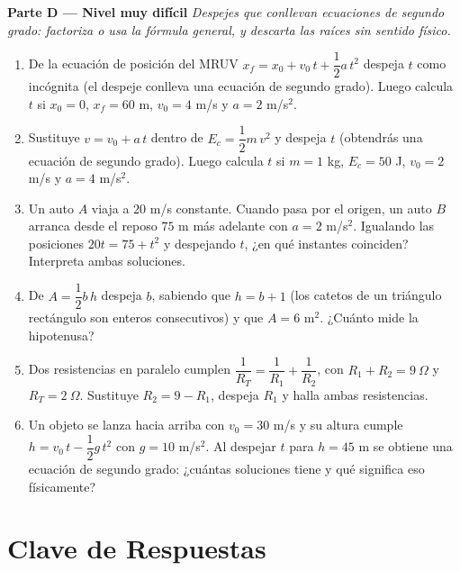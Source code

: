 \documentclass[12pt, letterpaper]{article}
\begin{document}
\medskip
\noindent\textbf{Parte D --- Nivel muy difícil \muyDificil}\quad \emph{Despejes que conllevan ecuaciones de segundo grado: factoriza o usa la fórmula general, y descarta las raíces sin sentido físico.}

\begin{enumerate}[leftmargin=*, resume]
  \item \muyDificil{} De la ecuación de posición del MRUV $x_f = x_0 + v_0\,t + \dfrac{1}{2}a\,t^2$ despeja $t$ como incógnita (el despeje conlleva una ecuación de segundo grado). Luego calcula $t$ si $x_0 = 0$, $x_f = 60$ m, $v_0 = 4$ m/s y $a = 2$ m/s$^2$.

  \item \muyDificil{} Sustituye $v = v_0 + a\,t$ dentro de $E_c = \dfrac{1}{2}m\,v^2$ y despeja $t$ (obtendrás una ecuación de segundo grado). Luego calcula $t$ si $m = 1$ kg, $E_c = 50$ J, $v_0 = 2$ m/s y $a = 4$ m/s$^2$.

  \item \muyDificil{} Un auto $A$ viaja a $20$ m/s constante. Cuando pasa por el origen, un auto $B$ arranca desde el reposo $75$ m más adelante con $a = 2$ m/s$^2$. Igualando las posiciones $20t = 75 + t^2$ y despejando $t$, ¿en qué instantes coinciden? Interpreta ambas soluciones.

  \item \muyDificil{} De $A = \dfrac{1}{2}b\,h$ despeja $b$, sabiendo que $h = b + 1$ (los catetos de un triángulo rectángulo son enteros consecutivos) y que $A = 6$ m$^2$. ¿Cuánto mide la hipotenusa?

  \item \muyDificil{} Dos resistencias en paralelo cumplen $\dfrac{1}{R_T} = \dfrac{1}{R_1} + \dfrac{1}{R_2}$, con $R_1 + R_2 = 9\ \Omega$ y $R_T = 2\ \Omega$. Sustituye $R_2 = 9 - R_1$, despeja $R_1$ y halla ambas resistencias.

  \item \muyDificil{} Un objeto se lanza hacia arriba con $v_0 = 30$ m/s y su altura cumple $h = v_0\,t - \dfrac{1}{2}g\,t^2$ con $g = 10$ m/s$^2$. Al despejar $t$ para $h = 45$ m se obtiene una ecuación de segundo grado: ¿cuántas soluciones tiene y qué significa eso físicamente?
\end{enumerate}

\newpage

\ifmwclaves
  \section{Clave de Respuestas}
\end{document}
